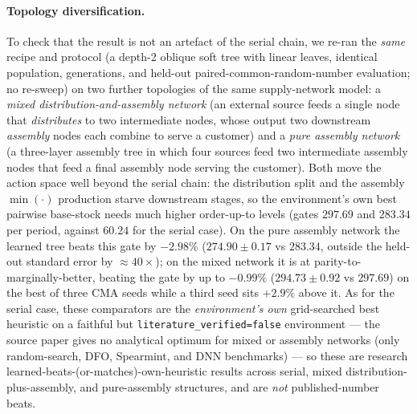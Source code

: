 \paragraph{Topology diversification.}
To check that the result is not an artefact of the serial chain, we re-ran the \emph{same} recipe and
protocol (a depth-2 oblique soft tree with linear leaves, identical population, generations, and
held-out paired-common-random-number evaluation; no re-sweep) on two further topologies of the same
supply-network model: a \emph{mixed distribution-and-assembly network} (an external source feeds a
single node that \emph{distributes} to two intermediate nodes, whose output two downstream
\emph{assembly} nodes each combine to serve a customer) and a \emph{pure assembly network} (a
three-layer assembly tree in which four sources feed two intermediate assembly nodes that feed a final
assembly node serving the customer). Both move the action space well beyond the serial chain: the
distribution split and the assembly $\min(\cdot)$ production starve downstream stages, so the
environment's own best pairwise base-stock needs much higher order-up-to levels (gates $297.69$ and
$283.34$ per period, against $60.24$ for the serial case). On the pure assembly network the learned
tree beats this gate by $-2.98\%$ ($274.90\pm0.17$ vs $283.34$, outside the held-out standard error by
$\approx40\times$); on the mixed network it is at parity-to-marginally-better, beating the gate by up
to $-0.99\%$ ($294.73\pm0.92$ vs $297.69$) on the best of three CMA seeds while a third seed sits
$+2.9\%$ above it. As for the serial case, these comparators are the \emph{environment's own}
grid-searched best heuristic on a faithful but \texttt{literature\_verified=false} environment --- the
source paper gives no analytical optimum for mixed or assembly networks (only random-search, DFO,
Spearmint, and DNN benchmarks) --- so these are research learned-beats-(or-matches)-own-heuristic
results across serial, mixed distribution-plus-assembly, and pure-assembly structures, and are
\emph{not} published-number beats.
